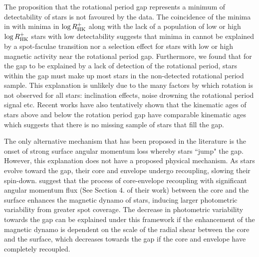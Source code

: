 The proposition that the rotational period gap represents a minimum of detectability of stars is not favoured by the data.
The coincidence of the minima in \rper{} with minima in $\log R^{+}_{\rm{HK}}$ along with the lack of a population of low or high $\log R^{+}_{\rm{HK}}$ stars with low detectability suggests that minima in \rper{} cannot be explained by a spot-faculae transition nor a selection effect for stars with low or high magnetic activity near the rotational period gap.
Furthermore, we found that for the gap to be explained by a lack of detection of the rotational period, stars within the gap must make up most stars in the \kepler{} non-detected rotational period sample.
This explanation is unlikely due to the many factors by which rotation is not observed for all stars: inclination effects, noise drowning the rotational period signal etc.
Recent works have also tentatively shown that the kinematic ages of stars above and below the rotation period gap have comparable kinematic ages \citep{lu_bridging_2022} which suggests that there is no missing sample of stars that fill the gap.

The only alternative mechanism that has been proposed in the literature is the onset of strong surface angular momentum loss whereby stars ``jump" the gap.
However, this explanation does not have a proposed physical mechanism.
As stars evolve toward the gap, their core and envelope undergo recoupling, slowing their spin-down.
\citet{cao_core-envelope_2023} suggest that the process of core-envelope recoupling with significant angular momentum flux (See Section 4. of their work) between the core and the surface enhances the magnetic dynamo of stars, inducing larger photometric variability from greater spot coverage.
The decrease in photometric variability towards the gap can be explained under this framework if the enhancement of the magnetic dynamo is dependent on the scale of the radial shear between the core and the surface, which decreases towards the gap if the core and envelope have completely recoupled.

